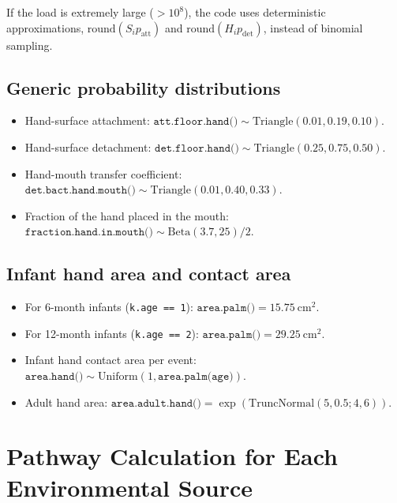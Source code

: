 \documentclass[11pt]{article}
\begin{document}
If the load is extremely large (\(>10^8\)), the code uses deterministic approximations, \(\text{round}(S_i p_{\text{att}})\) and \(\text{round}(H_i p_{\text{det}})\), instead of binomial sampling.

\subsection{Generic probability distributions}
\begin{itemize}[leftmargin=2em]
  \item Hand-surface attachment: \(\texttt{att.floor.hand()} \sim \mathrm{Triangle}(0.01, 0.19, 0.10)\).
  \item Hand-surface detachment: \(\texttt{det.floor.hand()} \sim \mathrm{Triangle}(0.25, 0.75, 0.50)\).
  \item Hand-mouth transfer coefficient: \(\texttt{det.bact.hand.mouth()} \sim \mathrm{Triangle}(0.01, 0.40, 0.33)\).
  \item Fraction of the hand placed in the mouth: \(\texttt{fraction.hand.in.mouth()} \sim \mathrm{Beta}(3.7, 25) / 2\).
\end{itemize}

\subsection{Infant hand area and contact area}
\begin{itemize}[leftmargin=2em]
  \item For 6-month infants (\texttt{k.age == 1}): \(\texttt{area.palm()} = 15.75\ \mathrm{cm}^2\).
  \item For 12-month infants (\texttt{k.age == 2}): \(\texttt{area.palm()} = 29.25\ \mathrm{cm}^2\).
  \item Infant hand contact area per event: \(\texttt{area.hand()} \sim \mathrm{Uniform}(1, \texttt{area.palm(age)})\).
  \item Adult hand area: \(\texttt{area.adult.hand()} = \exp(\mathrm{TruncNormal}(5, 0.5; 4, 6))\).
\end{itemize}

\section{Pathway Calculation for Each Environmental Source}
\end{document}
